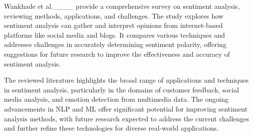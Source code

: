 Wankhade et al.____ provide a comprehensive survey on sentiment analysis, reviewing methods, applications, and challenges. The study explores how sentiment analysis can gather and interpret opinions from internet-based platforms like social media and blogs. It compares various techniques and addresses challenges in accurately determining sentiment polarity, offering suggestions for future research to improve the effectiveness and accuracy of sentiment analysis.

  
The reviewed literature highlights the broad range of applications and techniques in sentiment analysis, particularly in the domains of customer feedback, social media analysis, and emotion detection from multimedia data. The ongoing advancements in NLP and ML offer significant potential for improving sentiment analysis methods, with future research expected to address the current challenges and further refine these technologies for diverse real-world applications.